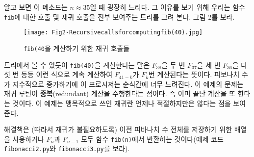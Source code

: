 \documentclass[a4paper]{oblivoir}
\begin{document}
알고 보면 이 메소드는 $n\approx35$일 때 굉장히 느리다. 그 이유를 보기 위해 우리는 함수 \texttt{fib}에 대한 호출 및 재귀 호출을 전부 보여주는 트리를 그려 본다. 그림 2를 보라.

\begin{figure}[h]
    \centering
    \texttt{[image: Fig2-Recursivecallsforcomputingfib(40).jpg]}
    \caption{\texttt{fib(40}을 계산하기 위한 재귀 호출들}
\end{figure}

트리에서 볼 수 있듯이 \texttt{fib(40)}을 계산한다는 말은 $F_{38}$을 두 번 $F_{37}$을 세 번 $F_{36}$을 다섯 번 등등 이런 식으로 계속 계산하여 $F_{41-k}$가 $F_k$번 계산된다는 뜻이다. 피보나치 수가 지수적으로 증가하기에 이 프로시저는 순식간에 너무 느려진다. 이 예제의 문제는 재귀 루틴이 \textbf{중복}(redundant) 계산을 수행한다는 점이다. 즉 이미 끝난 계산을 또 한다는 것이다. 이 예제는 맹목적으로 쓰인 재귀란 언제나 적절하지만은 않다는 점을 보여준다. 

해결책은 (따라서 재귀가 불필요하도록) 이전 피바나치 수 전체를 저장하기 위한 배열을 사용하거나 $F_n$과 $F_{n-1}$ 모두 함수 \texttt{fib(n)}에서 반환하는 것이다(예제 코드 \texttt{fibonacci2.py}와 \texttt{fibonacci3.py}를 보라).
\end{document}

